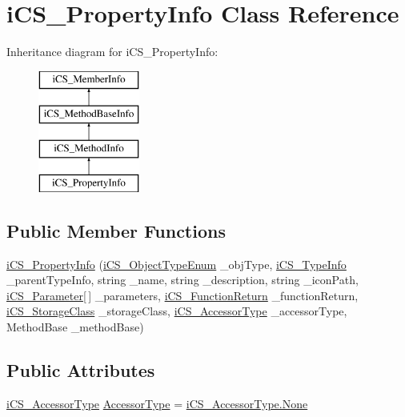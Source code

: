 \hypertarget{classi_c_s___property_info}{\section{i\+C\+S\+\_\+\+Property\+Info Class Reference}
\label{classi_c_s___property_info}
}
Inheritance diagram for i\+C\+S\+\_\+\+Property\+Info\+:\begin{figure}[H]
\begin{center}
\leavevmode
\includegraphics[height=4.000000cm]{classi_c_s___property_info}
\end{center}
\end{figure}
\subsection*{Public Member Functions}
\begin{DoxyCompactItemize}
\item 
\hyperlink{classi_c_s___property_info_ad1a1654ffea4f9b43bdd67e692a93ef6}{i\+C\+S\+\_\+\+Property\+Info} (\hyperlink{i_c_s___object_type_enum_8cs_ae6c3dd6d8597380b56d94908eb431547}{i\+C\+S\+\_\+\+Object\+Type\+Enum} \+\_\+obj\+Type, \hyperlink{classi_c_s___type_info}{i\+C\+S\+\_\+\+Type\+Info} \+\_\+parent\+Type\+Info, string \+\_\+name, string \+\_\+description, string \+\_\+icon\+Path, \hyperlink{classi_c_s___parameter}{i\+C\+S\+\_\+\+Parameter}\mbox{[}$\,$\mbox{]} \+\_\+parameters, \hyperlink{classi_c_s___function_return}{i\+C\+S\+\_\+\+Function\+Return} \+\_\+function\+Return, \hyperlink{i_c_s___storage_class_8cs_a4e1bb1da155050e4b0d0118f813194aa}{i\+C\+S\+\_\+\+Storage\+Class} \+\_\+storage\+Class, \hyperlink{i_c_s___accessor_type_8cs_ad7e8f7d8ee47401a5018d852892043d9}{i\+C\+S\+\_\+\+Accessor\+Type} \+\_\+accessor\+Type, Method\+Base \+\_\+method\+Base)
\end{DoxyCompactItemize}
\subsection*{Public Attributes}
\begin{DoxyCompactItemize}
\item 
\hyperlink{i_c_s___accessor_type_8cs_ad7e8f7d8ee47401a5018d852892043d9}{i\+C\+S\+\_\+\+Accessor\+Type} \hyperlink{classi_c_s___property_info_aaf271445bc07a18a5365121d50e23b46}{Accessor\+Type} = \hyperlink{i_c_s___edge_enum_8cs_af0c43d9550817659c245d5d49fbb4771a6adf97f83acf6453d4a6a4b1070f3754}{i\+C\+S\+\_\+\+Accessor\+Type.\+None}
\end{DoxyCompactItemize}
